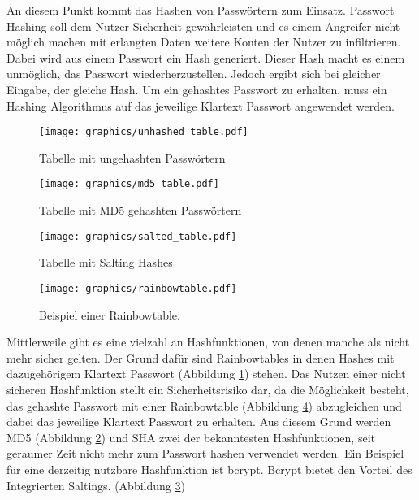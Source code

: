 
An diesem Punkt kommt das Hashen von Passwörtern zum Einsatz. Passwort Hashing soll dem Nutzer Sicherheit gewährleisten und es einem Angreifer nicht möglich machen mit erlangten Daten weitere Konten der Nutzer zu infiltrieren. Dabei wird aus einem Passwort ein Hash generiert. Dieser Hash macht es einem unmöglich, das Passwort wiederherzustellen. Jedoch ergibt sich bei gleicher Eingabe, der gleiche Hash. Um ein gehashtes Passwort zu erhalten, muss ein Hashing Algorithmus auf das jeweilige Klartext Passwort angewendet werden.

\begin{figure}
	\texttt{[image: graphics/unhashed\_table.pdf]}
	\caption{Tabelle mit ungehashten Passwörtern}
	\label{fig:unhashed_table}
\end{figure}

\begin{figure}
	\texttt{[image: graphics/md5\_table.pdf]}
	\caption{Tabelle mit MD5 gehashten Passwörtern}
	\label{fig:md5_hashed_table}
\end{figure}

\begin{figure}
	\texttt{[image: graphics/salted\_table.pdf]}
	\caption{Tabelle mit Salting Hashes}
	\label{fig:salted_table}
\end{figure}

\begin{figure}
	\texttt{[image: graphics/rainbowtable.pdf]}
	\caption{Beispiel einer Rainbowtable.}
	\label{fig:rainbowtable}
\end{figure}

Mittlerweile gibt es eine vielzahl an Hashfunktionen, von denen manche als nicht mehr sicher gelten. Der Grund dafür sind Rainbowtables in denen Hashes mit dazugehörigem Klartext Passwort (Abbildung \ref{fig:unhashed_table}) stehen. Das Nutzen einer nicht sicheren Hashfunktion stellt ein Sicherheitsrisiko dar, da die Möglichkeit besteht, das gehashte Passwort mit einer Rainbowtable (Abbildung \ref{fig:rainbowtable}) abzugleichen und dabei das jeweilige Klartext Passwort zu erhalten. Aus diesem Grund werden MD5 (Abbildung \ref{fig:md5_hashed_table}) und SHA zwei der bekanntesten Hashfunktionen, seit geraumer Zeit nicht mehr zum Passwort hashen verwendet werden. Ein Beispiel für eine derzeitig nutzbare Hashfunktion ist bcrypt. Bcrypt bietet den Vorteil des Integrierten Saltings. (Abbildung \ref{fig:salted_table})

